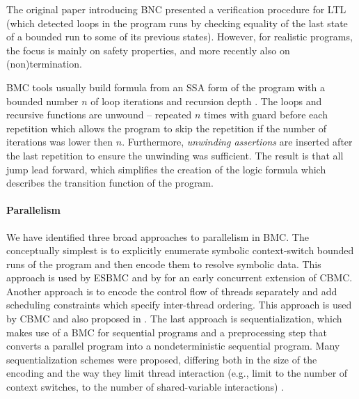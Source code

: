 The original paper introducing BNC presented a verification procedure for LTL
(which detected loops in the program runs by checking equality of the last
state of a bounded run to some of its previous states).
However, for realistic programs, the focus is mainly on safety properties, and
more recently also on (non)termination.

BMC tools usually build formula from an SSA form of the program with a bounded number $n$ of loop iterations and recursion depth .
The loops and recursive functions are unwound -- repeated $n$ times with guard before each repetition which allows the program to skip the repetition if the number of iterations was lower then $n$.
Furthermore, \emph{unwinding assertions} are inserted after the last repetition to ensure the unwinding was sufficient.
The result is that all jump lead forward, which simplifies the creation of the logic formula which describes the transition function of the program.

\paragraph{Parallelism}

We have identified three broad approaches to parallelism in BMC.
The conceptually simplest is to explicitly enumerate symbolic context-switch
bounded runs of the program and then encode them to resolve symbolic data.
This approach is used by ESBMC  and by
 for an early concurrent extension of CBMC.
Another approach is to encode the control flow of threads separately and add scheduling constraints which specify inter-thread ordering.
This approach is used by CBMC  and also proposed in .
The last approach is sequentialization, which makes use of a BMC for sequential programs and a preprocessing step that converts a parallel program into a nondeterministic sequential program.
Many sequentialization schemes were proposed, differing both in the size of the encoding and the way they limit thread interaction (e.g., limit to the number of context switches, to the number of shared-variable interactions) .

